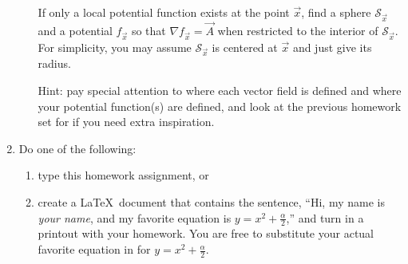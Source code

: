 \documentclass[letter]{article}
\begin{document}
\begin{enumerate}
\begin{enumerate}
					If only a local potential function exists at the point $\vec x$, find a
					sphere $\mathcal S_{\vec x}$ and a 
					potential $f_{\vec x}$ so that $\nabla f_{\vec x} = \vec A$ when restricted to the interior
					of $\mathcal S_{\vec x}$.  For simplicity, you may assume $\mathcal S_{\vec x}$ is centered at $\vec x$
					and just give its radius.
					
					Hint: pay special attention to where each vector field is defined and 
					where your potential function(s) are defined, and look at the previous homework set for if you need extra
					inspiration.

			\end{enumerate}

		\item Do one of the following:
			\begin{enumerate}
				\item type this homework assignment, or
				\item create a \LaTeX\ document that contains the sentence, ``Hi, my name is \emph{your name},
					and my favorite equation is $y=x^2+\frac{\alpha}{2}$,'' and turn in a printout
					with your homework. You are free to substitute your
					actual favorite equation in for $y=x^2+\frac{\alpha}{2}$.
			\end{enumerate}

	\end{enumerate}
\end{document}
